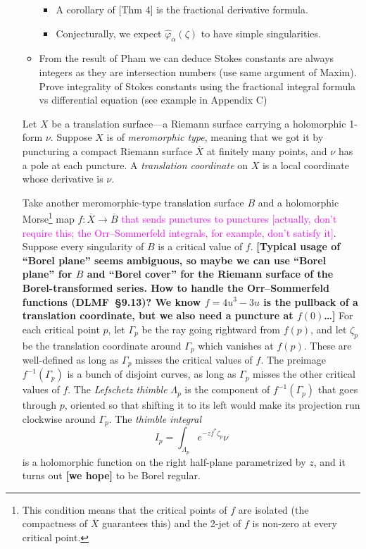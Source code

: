 \documentclass{article}
\newcommand{\maps}{\colon}
\begin{document}
\begin{itemize}
\begin{itemize}
\begin{itemize}
\item A corollary of [Thm 4] is the fractional derivative formula.
\item Conjecturally, we expect $\hat{\varphi}_\alpha(\zeta)$ to have simple singularities. 
\end{itemize}
\item From the result of Pham we can deduce Stokes constants are always integers as they are intersection numbers (use same argument of Maxim). Prove integrality of Stokes constants using the fractional integral formula vs differential equation (see example in Appendix C) 
\end{itemize}

\color{DarkGreen}
Let $X$ be a translation surface---a Riemann surface carrying a holomorphic 1-form $\nu$. Suppose $X$ is of {\em meromorphic type}, meaning that we got it by puncturing a compact Riemann surface $\overline{X}$ at finitely many points, and $\nu$ has a pole at each puncture. A {\em translation coordinate} on $X$ is a local coordinate whose derivative is $\nu$.

Take another meromorphic-type translation surface $B$ and a holomorphic Morse\footnote{This condition means that the critical points of $f$ are isolated (the compactness of $\overline{X}$ guarantees this) and the 2-jet of $f$ is non-zero at every critical point.} map $f \maps \overline{X} \to \overline{B}$ \textcolor{magenta}{that sends punctures to punctures [actually, don't require this; the Orr--Sommerfeld integrals, for example, don't satisfy it]}. Suppose every singularity of $B$ is a critical value of $f$. \textbf{[Typical usage of ``Borel plane'' seems ambiguous, so maybe we can use ``Borel plane'' for $B$ and ``Borel cover'' for the Riemann surface of the Borel-transformed series. How to handle the Orr–Sommerfeld functions (DLMF~\S 9.13)? We know $f = 4u^3 - 3u$ is the pullback of a translation coordinate, but we also need a puncture at $f(0)$\ldots]} For each critical point $p$, let $\Gamma_p$ be the ray going rightward from $f(p)$, and let $\zeta_p$ be the translation coordinate around $\Gamma_p$ which vanishes at $f(p)$. These are well-defined as long as $\Gamma_p$ misses the critical values of $f$. The preimage $f^{-1}(\Gamma_p)$ is a bunch of disjoint curves, as long as $\Gamma_p$ misses the other critical values of $f$. The {\em Lefschetz thimble} $\Lambda_p$ is the component of $f^{-1}(\Gamma_p)$ that goes through $p$, oriented so that shifting it to its left would make its projection run clockwise around $\Gamma_p$. The {\em thimble integral}
\[ I_p = \int_{\Lambda_p} e^{-z f^*\zeta_p} \nu \]
is a holomorphic function on the right half-plane parametrized by $z$, and it turns out \textbf{[we hope]} to be Borel regular.


\end{itemize}
\end{document}
